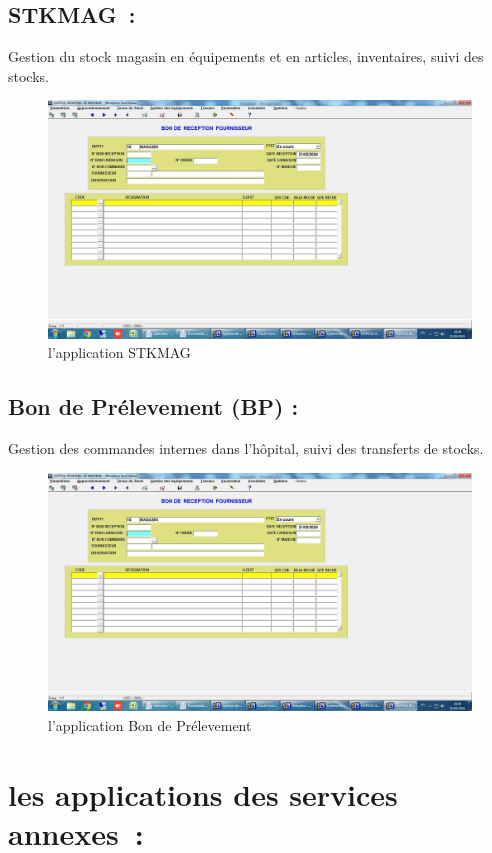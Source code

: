 \documentclass[12pt]{rapportINPTCLOUD}
\begin{document}
\subsection{STKMAG :} Gestion du stock magasin en équipements et en articles, inventaires, suivi des stocks.
\begin{figure}[H]
	\centering
	\includegraphics[width=1\linewidth]{img/f.jpg}
	\caption{l'application STKMAG}
	\label{fig:STKMAG}
\end{figure}

\subsection{Bon de Prélevement (BP) :} Gestion des commandes internes dans l'hôpital, suivi des transferts de stocks.
\begin{figure}[H]
	\centering
	\includegraphics[width=1\linewidth]{img/g.jpg}
	\caption{l'application Bon de Prélevement}
	\label{fig:Bon de Prélevement}
\end{figure}
	\section{\textcolor{sectioncolor}{les applications des services annexes :}}
\end{document}
